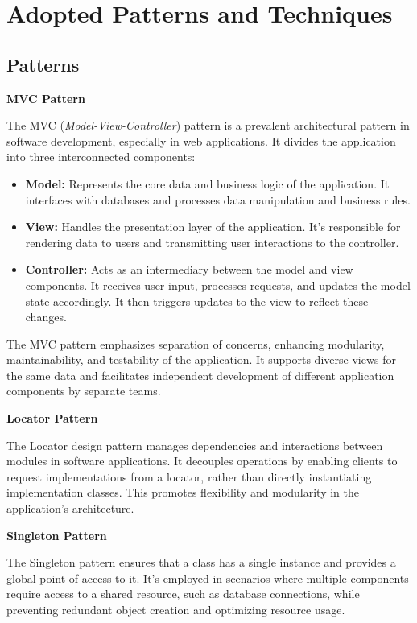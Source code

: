 \section{Adopted Patterns and Techniques}
\subsection*{Patterns}

\textbf{MVC Pattern}

The MVC (\textit{Model-View-Controller}) pattern is a prevalent architectural pattern in software development, 
especially in web applications. It divides the application into three interconnected components:

\begin{itemize}
  \item \textbf{Model:} Represents the core data and business logic of the application. It interfaces with 
  databases and processes data manipulation and business rules.
  
  \item \textbf{View:} Handles the presentation layer of the application. It's responsible for rendering data 
  to users and transmitting user interactions to the controller.
  
  \item \textbf{Controller:} Acts as an intermediary between the model and view components. It receives user 
  input, processes requests, and updates the model state accordingly. It then triggers updates to the view to reflect these changes.
\end{itemize}

The MVC pattern emphasizes separation of concerns, enhancing modularity, maintainability, and testability of the 
application. It supports diverse views for the same data and facilitates independent development of different 
application components by separate teams.

\textbf{Locator Pattern}

The Locator design pattern manages dependencies and interactions between modules in software applications. It 
decouples operations by enabling clients to request implementations from a locator, rather than directly instantiating 
implementation classes. This promotes flexibility and modularity in the application's architecture.

\textbf{Singleton Pattern}

The Singleton pattern ensures that a class has a single instance and provides a global point of access to it. It's 
employed in scenarios where multiple components require access to a shared resource, such as database connections, 
while preventing redundant object creation and optimizing resource usage.

